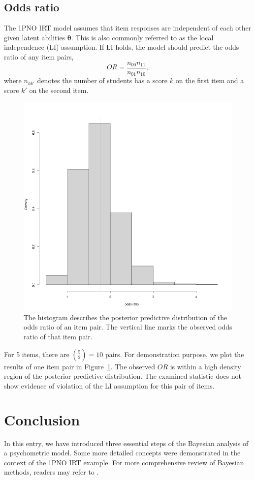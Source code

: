 \documentclass[floatsintext, man]{apa7}
\begin{document}
\subsection{Odds ratio}
The 1PNO IRT model assumes that item responses are independent of each other
given latent abilities $\bm{\theta}$. This is also commonly referred to as the
local independence (LI) assumption. If LI holds, the model should predict the
odds ratio of any item pairs,
\begin{equation}
  OR = \frac{n_{00} n_{11}}{n_{01} n_{10}},
\end{equation}
where $n_{kk'}$ denotes the number of students has a score $k$ on the first item
and a score $k'$ on the second item.
\begin{figure}
  \centering
  \includegraphics[scale=0.4]{Fig/ppmc_or.png}
  \caption{The histogram describes the posterior predictive distribution of the
  odds ratio of an item pair. The vertical line marks the observed odds ratio
  of that item pair.}
  \label{fig:ppmc_or}
\end{figure}
For 5 items, there are $\binom{5}{2} = 10$ pairs. For demonstration purpose, we
plot the results of one item pair in Figure~\ref{fig:ppmc_or}. The observed $OR$
is within a high density region of the posterior predictive distribution. The
examined statistic does not show evidence of violation of the LI assumption for
this pair of items.

\section{Conclusion}
In this entry, we have introduced three essential steps of the Bayesian analysis
of a psychometric model. Some more detailed concepts were demonstrated in the
context of the 1PNO IRT example. For more comprehensive review of Bayesian
methods, readers may refer to \textcite{gelman_bayesian_2013}.


\printbibliography
\end{document}
